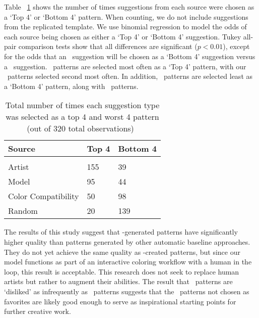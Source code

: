 Table ~\ref{table:study} shows the number of times suggestions from each source were chosen as a `Top 4' or `Bottom 4' pattern. When counting, we do not include suggestions from the replicated template. We use binomial regression to model the odds of each source being chosen as either a `Top 4' or `Bottom 4' suggestion. Tukey all-pair comparison tests show that all differences are significant ($p < 0.01$), except for the odds that an \artistSource~suggestion will be chosen as a `Bottom 4' suggestion versus a \modelSource~suggestion. \artistSource~patterns are selected most often as a `Top 4' pattern, with our \modelSource~patterns selected second most often. In addition, \modelSource~patterns are selected least as a `Bottom 4' pattern, along with \artistSource~patterns.


\begin{table}[h!]
  \begin{center}
\begin{tabular}{l| l l}
  \hline
\textbf{Source} & \textbf{Top 4} & \textbf{Bottom 4} \\
  \hline \\[-1.0em]
Artist & 155 & 39\\
Model & 95 & 44 \\
Color Compatibility & 50 & 98  \\
Random & 20 & 139 \\
\hline
\end{tabular}
\end{center}
\caption{Total number of times each suggestion type was selected as a top 4 and worst 4 pattern (out of 320 total observations)~}

 \label{table:study}
\end{table}

The results of this study suggest that \modelSource-generated patterns have significantly higher quality than patterns generated by other automatic baseline approaches. They do not yet achieve the same quality as \artistSource-created patterns, but since our model functions as part of an interactive coloring workflow with a human in the loop, this result is acceptable. This research does not seek to replace human artists but rather to augment their abilities. The result that \modelSource~patterns are `disliked' as infrequently as \artistSource~patterns suggests that the \modelSource~patterns not chosen as favorites are likely good enough to serve as inspirational starting points for further creative work.